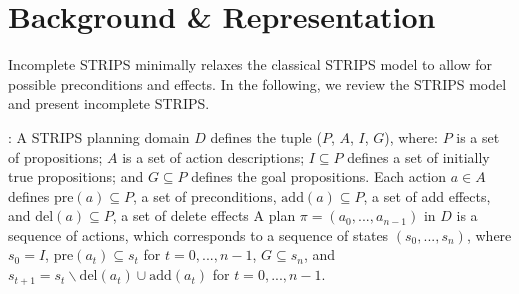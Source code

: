 \documentclass[letterpaper]{article}
\def\und#1{\noindent{\bf #1}:}
\def\citep#1{\cite{#1}}
\begin{document}
\section{Background \& Representation}\label{sec:background}

Incomplete STRIPS minimally relaxes the classical STRIPS model to allow for possible preconditions and effects.  In the following, we review the STRIPS model and present incomplete STRIPS.

\und{STRIPS Domains} A STRIPS  \citep{strips} planning domain $D$  defines the tuple ($P$, $A$, $I$, $G$), where: $P$ is a set of propositions; $A$ is a set of action descriptions; $I \subseteq P$ defines a set of initially true propositions; and  $G \subseteq P$ defines the goal propositions.  Each action $a \in A$ defines $\text{pre}(a) \subseteq P$, a set of preconditions, $\text{add}(a) \subseteq P$, a set of add effects, and $\text{del}(a) \subseteq P$, a set of delete effects
%
A plan $\pi = (a_0, ..., a_{n-1})$ in $D$ is a sequence of actions, which corresponds to a sequence of states $(s_0, ..., s_n)$, where $s_0 = I$, $\text{pre}(a_t) \subseteq s_t$ for $t = 0,..., n-1$, $G \subseteq s_n$, and
$s_{t+1} = s_t \backslash \text{del}(a_t) \cup \text{add}(a_t)$ for $t = 0,..., n-1$.
%
\end{document}
